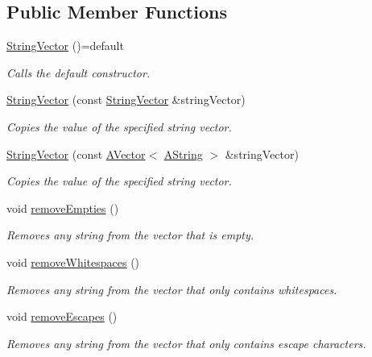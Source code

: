 \subsection*{Public Member Functions}
\begin{DoxyCompactItemize}
\item 
\mbox{\label{class_string_vector_a0ae8d9325b6d7be06f8681ef0181e07f}} 
\mbox{\hyperlink{class_string_vector_a0ae8d9325b6d7be06f8681ef0181e07f}{String\+Vector}} ()=default
\begin{DoxyCompactList}\small\item\em Calls the default constructor. \end{DoxyCompactList}\item 
\mbox{\hyperlink{class_string_vector_ad550561da75be936dda9071f6e0b4a58}{String\+Vector}} (const \mbox{\hyperlink{class_string_vector}{String\+Vector}} \&string\+Vector)
\begin{DoxyCompactList}\small\item\em Copies the value of the specified string vector. \end{DoxyCompactList}\item 
\mbox{\hyperlink{class_string_vector_ab8b7a61d3ebe3c40e7c080bf68970ad2}{String\+Vector}} (const \mbox{\hyperlink{class_a_vector}{A\+Vector}}$<$ \mbox{\hyperlink{class_a_string}{A\+String}} $>$ \&string\+Vector)
\begin{DoxyCompactList}\small\item\em Copies the value of the specified string vector. \end{DoxyCompactList}\item 
\mbox{\label{class_string_vector_aa12fb0e9769a4f3903f7b97aca3b45f9}} 
void \mbox{\hyperlink{class_string_vector_aa12fb0e9769a4f3903f7b97aca3b45f9}{remove\+Empties}} ()
\begin{DoxyCompactList}\small\item\em Removes any string from the vector that is empty. \end{DoxyCompactList}\item 
\mbox{\label{class_string_vector_a9723199c06d3a1396aff0663d9ff7218}} 
void \mbox{\hyperlink{class_string_vector_a9723199c06d3a1396aff0663d9ff7218}{remove\+Whitespaces}} ()
\begin{DoxyCompactList}\small\item\em Removes any string from the vector that only contains whitespaces. \end{DoxyCompactList}\item 
\mbox{\label{class_string_vector_a7c39c268480229a8dbd7dea9ba5f33a8}} 
void \mbox{\hyperlink{class_string_vector_a7c39c268480229a8dbd7dea9ba5f33a8}{remove\+Escapes}} ()
\begin{DoxyCompactList}\small\item\em Removes any string from the vector that only contains escape characters. \end{DoxyCompactList}\end{DoxyCompactItemize}


